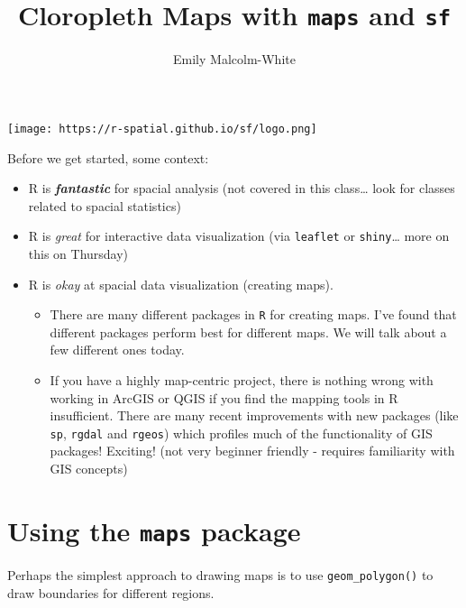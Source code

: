 \documentclass[
  letterpaper,
  DIV=11,
  numbers=noendperiod]{scrartcl}
\title{Cloropleth Maps with \texttt{maps} and \texttt{sf}}
\author{Emily Malcolm-White}
\date{}
\providecommand{\tightlist}{%
  \setlength{\itemsep}{0pt}\setlength{\parskip}{0pt}}\usepackage{longtable,booktabs,array}
\begin{document}
\maketitle
\ifdefined\Shaded\renewenvironment{Shaded}{\begin{tcolorbox}[frame hidden, enhanced, borderline west={3pt}{0pt}{shadecolor}, breakable, sharp corners, boxrule=0pt, interior hidden]}{\end{tcolorbox}}\fi

\texttt{[image: https://r-spatial.github.io/sf/logo.png]}

Before we get started, some context:

\begin{itemize}
\tightlist
\item
  R is \textbf{\emph{fantastic}} for spacial analysis (not covered in
  this class\ldots{} look for classes related to spacial statistics)
\item
  R is \emph{great} for interactive data visualization (via
  \texttt{leaflet} or \texttt{shiny}\ldots{} more on this on Thursday)
\item
  R is \emph{okay} at spacial data visualization (creating maps).

  \begin{itemize}
  \tightlist
  \item
    There are many different packages in \texttt{R} for creating maps.
    I've found that different packages perform best for different maps.
    We will talk about a few different ones today.
  \item
    If you have a highly map-centric project, there is nothing wrong
    with working in ArcGIS or QGIS if you find the mapping tools in R
    insufficient. There are many recent improvements with new packages
    (like \texttt{sp}, \texttt{rgdal} and \texttt{rgeos}) which profiles
    much of the functionality of GIS packages! Exciting! (not very
    beginner friendly - requires familiarity with GIS concepts)
  \end{itemize}
\end{itemize}

\hypertarget{using-the-maps-package}{%
\section{\texorpdfstring{Using the \texttt{maps}
package}{Using the maps package}}\label{using-the-maps-package}}

Perhaps the simplest approach to drawing maps is to use
\texttt{geom\_polygon()} to draw boundaries for different regions.
\end{document}
